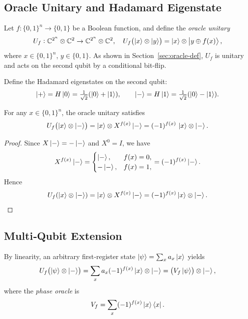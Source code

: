 \subsection{Oracle Unitary and Hadamard Eigenstate}
Let $f:\{0,1\}^n\to\{0,1\}$ be a Boolean function, and define the \emph{oracle unitary}
\[
U_f:\mathbb C^{2^n}\otimes\mathbb C^2 \to \mathbb C^{2^n}\otimes\mathbb C^2,
\quad
U_f\bigl(\ket{x}\otimes\ket{y}\bigr)=\ket{x}\otimes\ket{y\oplus f(x)},
\]
where $x\in\{0,1\}^n$, $y\in\{0,1\}$.  As shown in Section~\ref{sec:oracle-def}, $U_f$ is unitary and acts on the second qubit by a conditional bit‐flip.

Define the Hadamard eigenstates on the second qubit:
\[
\ket{+}=H\ket{0}=\tfrac1{\sqrt2}(\ket{0}+\ket{1}),
\qquad
\ket{-}=H\ket{1}=\tfrac1{\sqrt2}(\ket{0}-\ket{1}).
\]

\begin{lemma}
	For any $x\in\{0,1\}^n$, the oracle unitary satisfies
	\[
	U_f\bigl(\ket{x}\otimes\ket{-}\bigr)
	=\ket{x}\otimes X^{f(x)}\ket{-}
	= (-1)^{f(x)}\,\ket{x}\otimes\ket{-}.
	\]
\end{lemma}

\begin{proof}
	Since $X\ket{-}=-\ket{-}$ and $X^0=I$, we have
	\[
	X^{f(x)}\ket{-}
	=\begin{cases}
		\ket{-}, & f(x)=0, \\
		-\ket{-}, & f(x)=1,
	\end{cases}
	= (-1)^{f(x)}\ket{-}.
	\]
	Hence
	\[
	U_f(\ket{x}\otimes\ket{-})
	= \ket{x}\otimes X^{f(x)}\ket{-}
	= (-1)^{f(x)}\ket{x}\otimes\ket{-}.
	\]
\end{proof}

\subsection{Multi‐Qubit Extension}
By linearity, an arbitrary first‐register state $\ket{\psi}=\sum_x a_x\ket{x}$ yields
\[
U_f\bigl(\ket{\psi}\otimes\ket{-}\bigr)
=\sum_{x}a_x(-1)^{f(x)}\ket{x}\otimes\ket{-}
= \bigl(V_f\ket{\psi}\bigr)\otimes\ket{-},
\]
where the \emph{phase oracle} is
\[
V_f=\sum_{x}(-1)^{f(x)}\ket{x}\bra{x}.
\]

